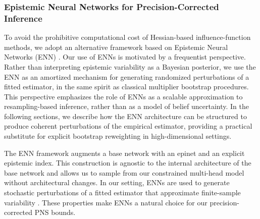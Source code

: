 \documentclass[accepted]{uai2026} %
\theoremstyle{plain}
\theoremstyle{definition}
\theoremstyle{remark}
\begin{document}
\vspace{-1em} %
\subsubsection{Epistemic Neural Networks for Precision-Corrected Inference}

To avoid the prohibitive computational cost of Hessian-based influence-function
methods, we adopt an alternative framework based on Epistemic Neural Networks
(ENN) \citep{osband2023epistemic}.
Our use of ENNs is motivated by a frequentist perspective.
Rather than interpreting epistemic variability as a Bayesian posterior,
we use the ENN as an amortized mechanism for generating randomized
perturbations of a fitted estimator, in the same spirit as classical
multiplier bootstrap procedures.
This perspective emphasizes the role of ENNs as a scalable approximation
to resampling-based inference, rather than as a model of belief uncertainty.
In the following sections, we describe how the ENN architecture can be
structured to produce coherent perturbations of the empirical estimator,
providing a practical substitute for explicit bootstrap reweighting in
high-dimensional settings.

The ENN framework augments a base network with an epinet and an explicit epistemic index.
This construction is agnostic to the internal architecture of the base network and allows us to sample from our constrained multi-head model without architectural changes.
In our setting, ENNs are used to generate stochastic perturbations of a fitted estimator that approximate finite-sample variability \citep{osband2018randomized,osband2023epistemic}.
These properties make ENNs a natural choice for our precision-corrected PNS bounds.
\end{document}
